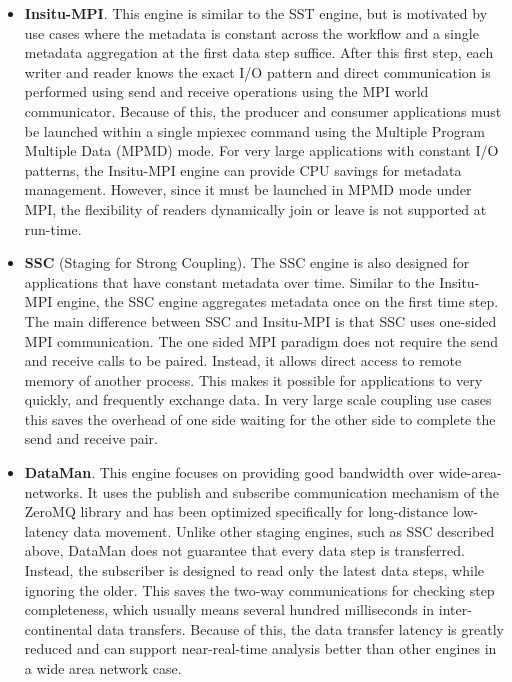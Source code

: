 \begin{itemize}
\item \textbf{Insitu-MPI}. This engine is similar to the SST engine, but is motivated by use cases where the metadata is constant across the workflow and a single metadata aggregation at the first data step suffice. After this first step, each writer and reader knows the exact I/O pattern and direct communication is performed using send and receive operations using the MPI world communicator. Because of this, the producer and consumer applications must be launched within a single mpiexec command using the Multiple Program Multiple Data (MPMD) mode.
For very large applications with constant I/O patterns, the Insitu-MPI engine can provide CPU savings for metadata management. However, since it must be launched in MPMD mode under MPI, the flexibility of readers dynamically join or leave is not supported at run-time.

\item \textbf{SSC} (Staging for Strong Coupling).
The SSC engine is also designed for applications that have constant metadata over time. Similar to the Insitu-MPI engine, the SSC engine aggregates metadata once on the first time step. The main difference between SSC and Insitu-MPI is that SSC uses one-sided MPI communication.
The one sided MPI paradigm does not require the send and receive calls to be paired. Instead, it allows direct access to remote memory of another process. This makes it possible for applications to very quickly, and frequently exchange data.
In very large scale coupling use cases this saves the overhead of one side waiting for the other side to complete the send and receive pair. 

\item \textbf{DataMan}. This engine focuses on providing good bandwidth over wide-area-networks. It uses the publish and subscribe communication mechanism of the ZeroMQ library and has been optimized specifically for long-distance low-latency data movement. Unlike other staging engines, such as SSC described above, DataMan does not guarantee that every data step is transferred. Instead, the subscriber is designed to read only the latest data steps, while ignoring the older. This saves the two-way communications for checking step completeness, which usually means several hundred milliseconds in inter-continental data transfers. Because of this, the data transfer latency is greatly reduced and can support near-real-time analysis better than other engines in a wide area network case.

\end{itemize}

